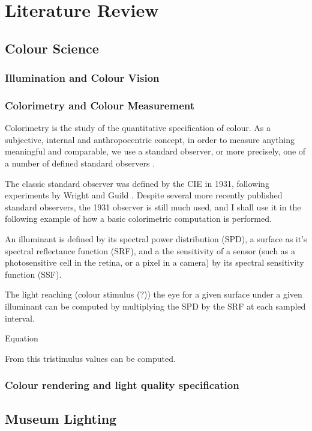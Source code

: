 \chapter{Literature Review}
\label{LitReview}

\section{Colour Science}
\subsection{Illumination and Colour Vision}
\subsection{Colorimetry and Colour Measurement}

Colorimetry is the study of the quantitative specification of colour. As a subjective, internal and anthropocentric concept, in order to measure anything meaningful and comparable, we use a standard observer, or more precisely, one of a number of defined standard observers \cite{cie_bs_2011}.

The classic standard observer was defined by the CIE in 1931, following experiments by Wright and Guild \cite{wright_re-determination_1929, guild_colorimetric_1931}. Despite several more recently published standard observers, the 1931 observer is still much used, and I shall use it in the following example of how a basic colorimetric computation is performed.

An illuminant is defined by its spectral power distribution (SPD), a surface as it's spectral reflectance function (SRF), and a the sensitivity of a sensor (such as a photosensitive cell in the retina, or a pixel in a camera) by its spectral sensitivity function (SSF).

The light reaching (colour stimulus (?)) the eye for a given surface under a given illuminant can be computed by multiplying the SPD by the SRF at each sampled interval.

Equation

From this tristimulus values can be computed.

\subsection{Colour rendering and light quality specification}

\section{Museum Lighting}
